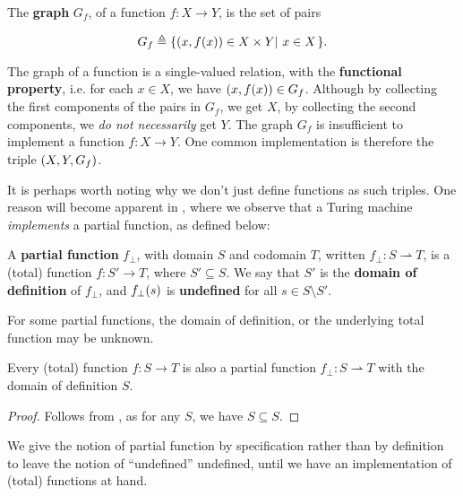 \begin{definition} The \textbf{graph} $G_f$, of a function $f:X\rightarrow Y$, is the
set of pairs

$$G_f\triangleq\mathopen{}\left\{{\mathopen{}\left({x,f\mathopen{}\left({x}\right)\mathclose{}}\right)\mathclose{}\in X \times Y\mathopen{}\left|\ {x\in X}\right.\mathclose{}}\right\}\mathclose{}.$$

\end{definition}

The graph of a function is a single-valued relation, with the
\textbf{functional property}, i.e. for each $x\in X$, we have $\mathopen{}\left({x,f\mathopen{}\left({x}\right)\mathclose{}}\right)\mathclose{} \in
G_f$. Although by collecting the first components of the pairs in $G_f$, we get
$X$, by collecting the second components, we \emph{do not necessarily} get $Y$.
The graph $G_f$ is insufficient to implement a function $f:X\rightarrow Y$. One
common implementation is therefore the triple $\mathopen{}\left({X,Y,G_f}\right)\mathclose{}$.

It is perhaps worth noting why we don't just define functions as such triples.
One reason will become apparent in ,
where we observe that a Turing machine \emph{implements} a partial function, as
defined below:

\begin{specification} \label{spec:partial-function} A \textbf{partial function}
$f_\bot$, with domain $S$ and codomain $T$, written $f_\bot : S \rightharpoonup
T$, is a (total) function $f : S' \rightarrow T$, where $S'\subseteq S$. We say
that $S'$ is the \textbf{domain of definition} of $f_\bot$, and $f_\bot\mathopen{}\left({s}\right)\mathclose{}$
is \textbf{undefined} for all $s\in S\setminus S'$.\end{specification}

\begin{remark} For some partial functions, the domain of definition, or the
underlying total function may be unknown. \end{remark}

\begin{corollary} Every (total) function $f : S \rightarrow T$ is also a
partial function $f_\bot : S \rightharpoonup T$ with the domain of definition
$S$. \end{corollary}

\begin{proof} Follows from , as for any $S$, we have
$S\subseteq S$.  \end{proof}

We give the notion of partial function by specification rather than by
definition to leave the notion of ``undefined'' undefined, until we have an
implementation of (total) functions at hand.

